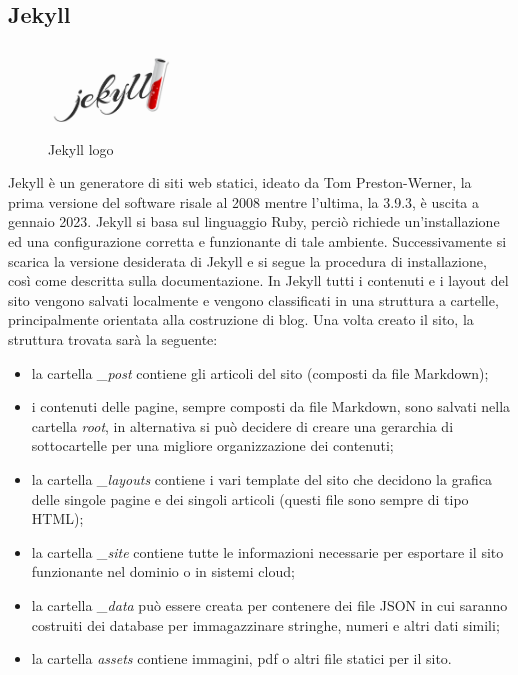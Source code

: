 \documentclass[target=bach,aauheader=]{thud}
\begin{document}
\subsection{Jekyll}
\begin{figure}
    \centering
    \includegraphics[width = 0.3\textwidth]{images/jekyll_teaser.png}
    \caption{Jekyll logo}
\end{figure}

Jekyll è un generatore di siti web statici, ideato da Tom Preston-Werner, la prima versione del software risale al 2008 mentre l'ultima, la 3.9.3, è uscita a gennaio 2023.
Jekyll si basa sul linguaggio Ruby, perciò richiede un'installazione ed una configurazione corretta e funzionante di tale ambiente.
Successivamente si scarica la versione desiderata di Jekyll e si segue la procedura di installazione, così come descritta sulla documentazione.
In Jekyll tutti i contenuti e i layout del sito vengono salvati localmente e vengono classificati in una struttura a cartelle, principalmente orientata alla costruzione di blog. \newline
Una volta creato il sito, la struttura trovata sarà la seguente:
\begin{itemize}
    \item la cartella \textit{\_post} contiene gli articoli del sito (composti da file Markdown);
    \item i contenuti delle pagine, sempre composti da file Markdown, sono salvati nella cartella \textit{root}, in alternativa si può decidere di creare una gerarchia di sottocartelle per una migliore organizzazione dei contenuti;
    \item la cartella \textit{\_layouts} contiene i vari template del sito che decidono la grafica delle singole pagine e dei singoli articoli (questi file sono sempre di tipo HTML);
    \item la cartella \textit{\_site} contiene tutte le informazioni necessarie per esportare il sito funzionante nel dominio o in sistemi cloud;
    \item la cartella \textit{\_data} può essere creata per contenere dei file JSON in cui saranno costruiti dei database per immagazzinare stringhe, numeri e altri dati simili;
    \item la cartella \textit{assets} contiene immagini, pdf o altri file statici per il sito.
\end{itemize}
\end{document}
